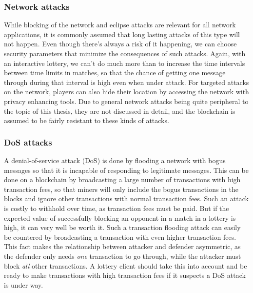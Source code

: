 \subsubsection{Network attacks} While blocking of the network and eclipse attacks are relevant for all network applications, it is commonly assumed that long lasting attacks of this type will not happen. Even though there's always a risk of it happening, we can choose security parameters that minimize the consequences of such attacks. Again, with an interactive lottery, we can't do much more than to increase the time intervals between time limits in matches, so that the chance of getting one message through during that interval is high even when under attack. For targeted attacks on the network, players can also hide their location by accessing the network with privacy enhancing tools. Due to general network attacks being quite peripheral to the topic of this thesis, they are not discussed in detail, and the blockchain is assumed to be fairly resistant to these kinds of attacks.

\subsubsection{DoS attacks}
A denial-of-service attack (DoS) is done by flooding a network with bogus messages so that it is incapable of responding to legitimate messages. This can be done on a blockchain by broadcasting a large number of transactions with high transaction fees, so that miners will only include the bogus transactions in the blocks and ignore other transactions with normal transaction fees. Such an attack is costly to withhold over time, as transaction fees must be paid. But if the expected value of successfully blocking an opponent in a match in a lottery is high, it can very well be worth it. Such a transaction flooding attack can easily be countered by broadcasting a transaction with even higher transaction fees. This fact makes the relationship between attacker and defender asymmetric, as the defender only needs \emph{one} transaction to go through, while the attacker must block \emph{all} other transactions. A lottery client should take this into account and be ready to make transactions with high transaction fees if it suspects a DoS attack is under way.

